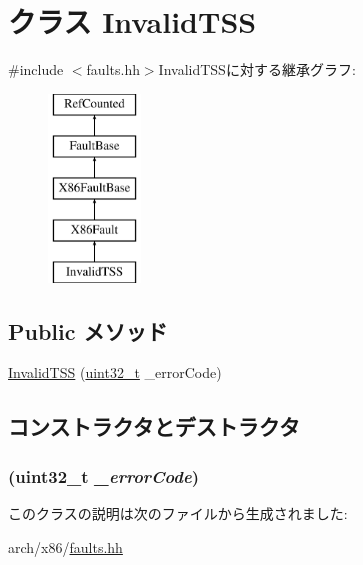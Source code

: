 \hypertarget{classX86ISA_1_1InvalidTSS}{
\section{クラス InvalidTSS}
\label{classX86ISA_1_1InvalidTSS}
}


{\ttfamily \#include $<$faults.hh$>$}InvalidTSSに対する継承グラフ:\begin{figure}[H]
\begin{center}
\leavevmode
\includegraphics[height=5cm]{classX86ISA_1_1InvalidTSS}
\end{center}
\end{figure}
\subsection*{Public メソッド}
\begin{DoxyCompactItemize}
\item 
\hyperlink{classX86ISA_1_1InvalidTSS_a0a280992fc97ca2bad24158c4948a3f4}{InvalidTSS} (\hyperlink{Type_8hh_a435d1572bf3f880d55459d9805097f62}{uint32\_\-t} \_\-errorCode)
\end{DoxyCompactItemize}


\subsection{コンストラクタとデストラクタ}
\hypertarget{classX86ISA_1_1InvalidTSS_a0a280992fc97ca2bad24158c4948a3f4}{
\subsubsection[{InvalidTSS}]{ ({\bf uint32\_\-t} {\em \_\-errorCode})}}
\label{classX86ISA_1_1InvalidTSS_a0a280992fc97ca2bad24158c4948a3f4}



\begin{DoxyCode}
274                                         :
275             X86Fault("Invalid-TSS", "#TS", 10, _errorCode)
276         {}
    };
\end{DoxyCode}


このクラスの説明は次のファイルから生成されました:\begin{DoxyCompactItemize}
\item 
arch/x86/\hyperlink{arch_2x86_2faults_8hh}{faults.hh}\end{DoxyCompactItemize}
